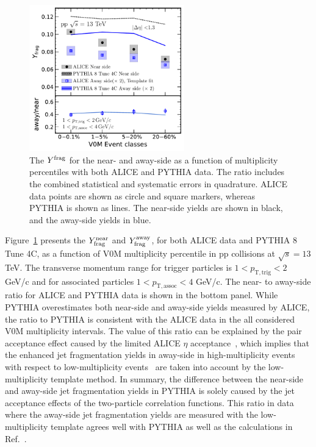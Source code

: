 \begin{figure}[h!]
	\centering
	\hspace{-3em}\includegraphics[width=0.6\textwidth]{figures/Fig5_Plot_v2Mult.pdf} 
	\caption{The $Y^{\rm{frag}}$ for the near- and away-side as a function of multiplicity percentiles with both ALICE and PYTHIA data. The ratio includes the combined statistical and systematic errors in quadrature. ALICE data points are shown as circle and square markers, whereas PYTHIA is shown as lines. The near-side yields are shown in black, and the away-side yields in blue.}
	\label{fig:Ymult}
\end{figure}

Figure~\ref{fig:Ymult} presents the $Y^{\mathrm{near}}_{\rm{frag}}$ and $Y^{\mathrm{away}}_{\rm{frag}}$, for both ALICE data and PYTHIA 8 Tune 4C, as a function of V0M multiplicity percentile in pp collisions at $\sqrt{s}=13$ TeV. The transverse momentum range for trigger particles is $1<p_\mathrm{T,trig}<2$ GeV/c and for associated particles $1<p_\mathrm{T,assoc}<4$ GeV/c.
The near- to away-side ratio for ALICE and PYTHIA data is shown in the bottom panel. While PYTHIA overestimates both near-side and away-side yields measured by ALICE, the ratio to PYTHIA is consistent with the ALICE data in the all considered V0M multiplicity intervals. The value of this ratio can be explained by the pair acceptance effect caused by the limited ALICE $\eta$ acceptance~\cite{PHENIX:2006gto}, which implies that the enhanced jet fragmentation yields in away-side in high-multiplicity events with respect to low-multiplicity events~\cite{ALICE:2013tla,ALICE:2014mas} are taken into account by the low-multiplicity template method. In summary, the difference between the near-side and away-side jet fragmentation yields in PYTHIA is solely caused by the jet acceptance effects of the two-particle correlation functions. This ratio in data where the away-side jet fragmentation yields are measured with the low-multiplicity template agrees well with PYTHIA as well as the calculations in Ref.~\cite{PHENIX:2006gto}.


